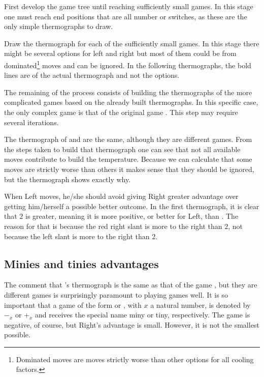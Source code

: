 First develop the game tree until reaching sufficiently small games. In this stage one must reach end positions that are all number or switches, as these are the only simple thermographs to draw.



Draw the thermograph for each of the sufficiently small games. In this stage there might be several options for left and right but most of them could be from dominated\footnote{Dominated moves are moves strictly worse than other options for all cooling factors.} moves and can be ignored. In the following thermographs, the bold lines are of the actual thermograph and not the options.



The remaining of the process consists of building the thermographs of the more complicated games based on the already built thermographs. In this specific case, the only complex game is that of the original game \Gm{}. This step may require several iterations.



The thermograph of \Gm{} and  are the same, although they are different games. From the steps taken to build that thermograph one can see that not all available moves contribute to build the temperature. Because we can calculate that some moves are strictly worse than others it makes sense that they should be ignored, but the thermograph shows exactly why.

When Left moves, he/she should avoid giving Right greater advantage over getting him/herself a possible better outcome. In the first thermograph, it is clear that $2$ is greater, meaning it is more positive, or better for Left, than . The reason for that is because the red right slant is more to the right than $2$, not because the left slant is more to the right than $2$.

\subsection*{Minies and tinies advantages}

The comment that \Gm{}'s thermograph is the same as that of the game , but they are different games is surprisingly paramount to playing games well. It is so important that a game of the form  or , with $x$ a natural number, is denoted by $-_x$ or $+_x$ and receives the special name miny or tiny, respectively. The game  is negative, of course, but Right's advantage is small. However, it is not the smallest possible.

